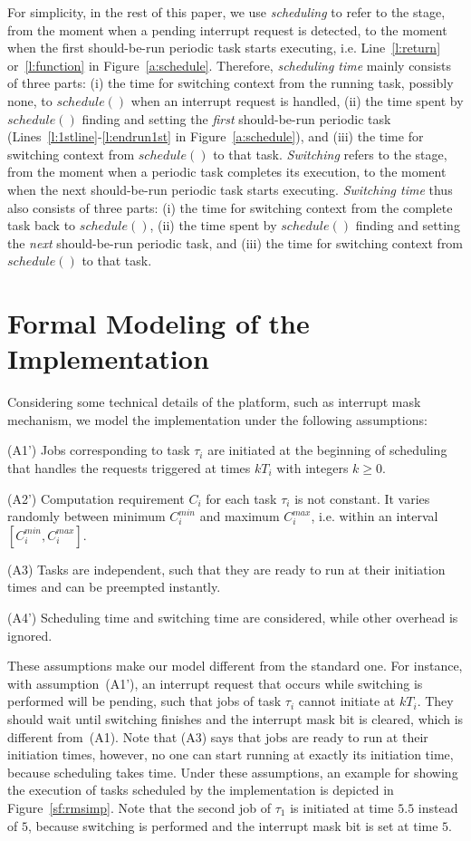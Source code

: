 \documentclass[10pt,journal]{IEEEtran}
\begin{document}
For simplicity, in the rest of this paper, we use \emph{scheduling} to
refer to the stage, from the moment when a pending interrupt request
is detected, to the moment when the first should-be-run periodic task
starts executing, i.e. Line~\ref{l:return} or~\ref{l:function} in
Figure~\ref{a:schedule}. Therefore, \emph{scheduling time} mainly
consists of three parts: (i) the time for switching context from the
running task, possibly none, to $schedule()$ when an interrupt request
is handled, (ii) the time spent by $schedule()$ finding and setting
the \emph{first} should-be-run periodic task
(Lines~\ref{l:1stline}-\ref{l:endrun1st} in Figure~\ref{a:schedule}),
and (iii) the time for switching context from $schedule()$ to that
task. \emph{Switching} refers to the stage, from the moment when a
periodic task completes its execution, to the moment when the next
should-be-run periodic task starts executing. \emph{Switching time}
thus also consists of three parts: (i) the time for switching context
from the complete task back to $schedule()$, (ii) the time spent by
$schedule()$ finding and setting the \emph{next} should-be-run
periodic task, and (iii) the time for switching context from
$schedule()$ to that task.


\section{Formal Modeling of the Implementation}
\label{s:formalism}
Considering some technical details of the platform, such as interrupt
mask mechanism, we model the implementation under the following
assumptions:

(A1') Jobs corresponding to task $\tau_i$ are initiated at the
beginning of scheduling that handles the requests triggered at times
$kT_i$ with integers $k\ge 0$.

(A2') Computation requirement $C_i$ for each task $\tau_i$ is not
constant. It varies randomly between minimum $C^{min}_i$ and maximum
$C^{max}_i$, i.e. within an interval $[C^{min}_i, C^{max}_i]$.

(A3) Tasks are independent, such that they are ready to run at their
initiation times and can be preempted instantly.

(A4') Scheduling time and switching time are considered, while other
overhead is ignored.

These assumptions make our model different from the standard one. For
instance, with assumption~(A1'), an interrupt request that occurs
while switching is performed will be pending, such that jobs of task
$\tau_i$ cannot initiate at $kT_i$. They should wait until switching
finishes and the interrupt mask bit is cleared, which is different
from~(A1). Note that (A3) says that jobs are ready to run at their
initiation times, however, no one can start running at exactly its
initiation time, because scheduling takes time. Under these
assumptions, an example for showing the execution of tasks scheduled
by the implementation is depicted in Figure~\ref{sf:rmsimp}. Note that
the second job of $\tau_1$ is initiated at time $5.5$ instead of $5$,
because switching is performed and the interrupt mask bit is set at
time $5$.
\end{document}
